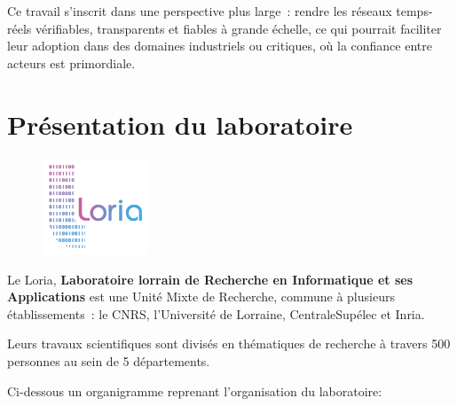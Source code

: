 \documentclass[12pt]{report}
\begin{document}
Ce travail s'inscrit dans une perspective plus large : rendre les 
réseaux temps-réels vérifiables, transparents et fiables à grande échelle, 
ce qui pourrait faciliter leur adoption dans des domaines industriels ou 
critiques, où la confiance entre acteurs est primordiale.

\section*{Présentation du laboratoire}

\begin{figure}
    \vspace{-10pt}
    \includegraphics[width=0.28\textwidth]{logo_loria.png}
    \vspace{-10pt}
\end{figure}

Le Loria, \textbf{Laboratoire lorrain de Recherche en Informatique et 
ses Applications} est une Unité Mixte de Recherche, commune à plusieurs 
établissements : le CNRS, l'Université de Lorraine, CentraleSupélec et 
Inria.

Leurs travaux scientifiques sont divisés en thématiques de recherche à travers 
500 personnes au sein de 5 départements.

\medskip

Ci-dessous un organigramme reprenant l'organisation du laboratoire:

\vspace{1cm}  
\end{document}
